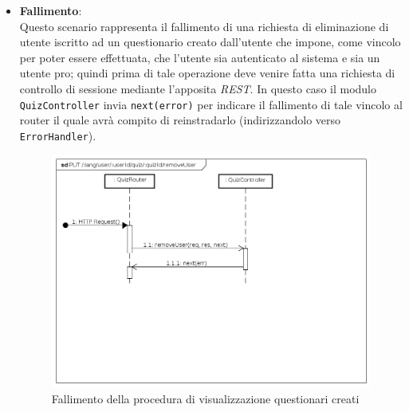 \begin{itemize}
\item \textbf{Fallimento}:\\
Questo scenario rappresenta il fallimento di una richiesta di eliminazione di utente iscritto ad un questionario creato dall'utente che impone, come vincolo per poter essere effettuata, che l'utente sia autenticato al sistema e sia un utente pro; quindi prima di tale operazione deve venire fatta una richiesta di controllo di sessione mediante l'apposita \textit{REST}. In questo caso il modulo \texttt{QuizController} invia \texttt{next(error)} per indicare il fallimento di tale vincolo al router il quale avrà compito di reinstradarlo (indirizzandolo verso \texttt{ErrorHandler}).
\label{Fallimento della procedura di rimozione di un utente iscritto ad un questionario creato}
\begin{figure}[ht]
	\centering
	\includegraphics[scale=0.40]{UML/DiagrammiDiSequenza/Back-end/PUT_LangUserUserIdQuizQuizIdRemoveUserFailure.png}
	\caption{Fallimento della procedura di visualizzazione questionari creati}
\end{figure}
\FloatBarrier
\end{itemize}





